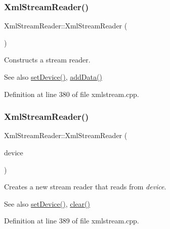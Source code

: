 \subsubsection{\texorpdfstring{Xml\+Stream\+Reader()}{XmlStreamReader()}\hspace{0.1cm}{\footnotesize\ttfamily [1/5]}}
{\footnotesize\ttfamily Xml\+Stream\+Reader\+::\+Xml\+Stream\+Reader (\begin{DoxyParamCaption}{ }\end{DoxyParamCaption})}

Constructs a stream reader.

\begin{DoxySeeAlso}{See also}
\hyperlink{class_xml_stream_reader_a0d166c5c7814d44a0015a82f0500cee5}{set\+Device()}, \hyperlink{class_xml_stream_reader_add6baa0f8790fc528c1fa6e05755f96b}{add\+Data()} 
\end{DoxySeeAlso}


Definition at line 380 of file xmlstream.\+cpp.

\mbox{\label{class_xml_stream_reader_a21d81e0a48fc957b40b7b735ab4c2b10}} 
\subsubsection{\texorpdfstring{Xml\+Stream\+Reader()}{XmlStreamReader()}\hspace{0.1cm}{\footnotesize\ttfamily [2/5]}}
{\footnotesize\ttfamily Xml\+Stream\+Reader\+::\+Xml\+Stream\+Reader (\begin{DoxyParamCaption}\item[{Q\+I\+O\+Device $\ast$}]{device }\end{DoxyParamCaption})\hspace{0.3cm}{\ttfamily [explicit]}}

Creates a new stream reader that reads from {\itshape device}.

\begin{DoxySeeAlso}{See also}
\hyperlink{class_xml_stream_reader_a0d166c5c7814d44a0015a82f0500cee5}{set\+Device()}, \hyperlink{class_xml_stream_reader_a2a67f5a1fff83d33214ccc9ec9494ca0}{clear()} 
\end{DoxySeeAlso}


Definition at line 389 of file xmlstream.\+cpp.

